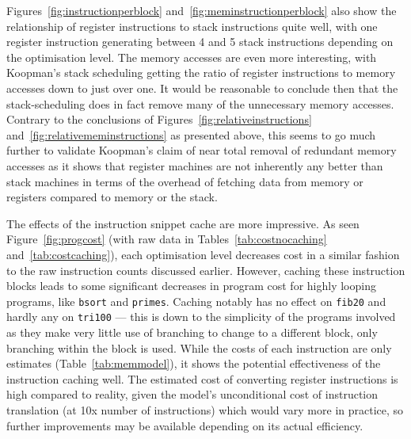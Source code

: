 Figures~\ref{fig:instructionperblock} and~\ref{fig:meminstructionperblock} also
show the relationship of register instructions to stack instructions quite well,
with one register instruction generating between 4 and 5 stack instructions
depending on the optimisation level. The memory accesses are even more
interesting, with Koopman's stack scheduling getting the ratio of register
instructions to memory accesses down to just over one. It would be reasonable to
conclude then that the stack-scheduling does in fact remove many of the
unnecessary memory accesses. Contrary to the conclusions of
Figures~\ref{fig:relativeinstructions} and~\ref{fig:relativememinstructions} as
presented above, this seems to go much further to validate Koopman's claim of
near total removal of redundant memory accesses as it shows that register
machines are not inherently any better than stack machines in terms of the
overhead of fetching data from memory or registers compared to memory or the
stack.

The effects of the instruction snippet cache are more impressive. As seen
Figure~\ref{fig:progcost} (with raw data in Tables~\ref{tab:costnocaching}
and~\ref{tab:costcaching}), each optimisation level decreases cost in a similar
fashion to the raw instruction counts discussed earlier. However, caching these
instruction blocks leads to some significant decreases in program cost for
highly looping programs, like \texttt{bsort} and \texttt{primes}. Caching
notably has no effect on \texttt{fib20} and hardly any on \texttt{tri100} ---
this is down to the simplicity of the programs involved as they make very little
use of branching to change to a different block, only branching within the block
is used. While the costs of each instruction are only estimates
(Table~\ref{tab:memmodel}), it shows the potential effectiveness of the
instruction caching well. The estimated cost of converting register instructions
is high compared to reality, given the model's unconditional cost of instruction
translation (at 10x number of instructions) which would vary more in practice,
so further improvements may be available depending on its actual efficiency.

